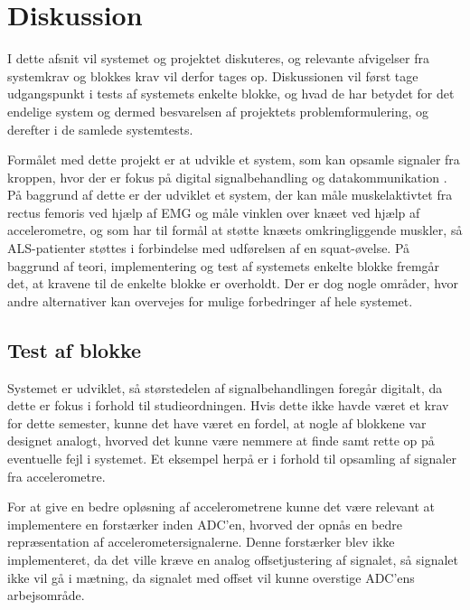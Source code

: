 \section{Diskussion}\label{sec:diskussion}
I dette afsnit vil systemet og projektet diskuteres, og relevante afvigelser fra systemkrav og blokkes krav vil derfor tages op. Diskussionen vil først tage udgangspunkt i tests af systemets enkelte blokke, og hvad de har betydet for det endelige system og dermed besvarelsen af projektets problemformulering, og derefter i de samlede systemtests. 

Formålet med dette projekt er at udvikle et system, som kan opsamle signaler fra kroppen, hvor der er fokus på digital signalbehandling og datakommunikation \citep{aalborguniversitet2014}. På baggrund af dette er der udviklet et system, der kan måle muskelaktivtet fra rectus femoris ved hjælp af EMG og måle vinklen over knæet ved hjælp af accelerometre, og som har til formål at støtte knæets omkringliggende muskler, så ALS-patienter støttes i forbindelse med udførelsen af en squat-øvelse. På baggrund af teori, implementering og test af systemets enkelte blokke fremgår det, at kravene til de enkelte blokke er overholdt. Der er dog nogle områder, hvor andre alternativer kan overvejes for mulige forbedringer af hele systemet. 

\subsection{Test af blokke}
Systemet er udviklet, så størstedelen af signalbehandlingen foregår digitalt, da dette er fokus i forhold til studieordningen. Hvis dette ikke havde været et krav for dette semester, kunne det have været en fordel, at nogle af blokkene var designet analogt, hvorved det kunne være nemmere at finde samt rette op på eventuelle fejl i systemet. Et eksempel herpå er i forhold til opsamling af signaler fra accelerometre. 

For at give en bedre opløsning af accelerometrene kunne det være relevant at implementere en forstærker inden ADC'en, hvorved der opnås en bedre repræsentation af accelerometersignalerne. Denne forstærker blev ikke implementeret, da det ville kræve en analog offsetjustering af signalet, så signalet ikke vil gå i mætning, da signalet med offset vil kunne overstige ADC'ens arbejsområde. %

